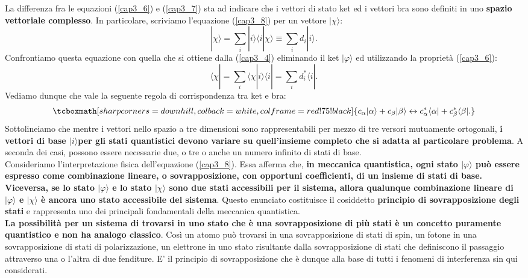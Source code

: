 \documentclass[a4paper,12pt,oneside]{book}
\begin{document}
La differenza fra le equazioni (\ref{cap3_6}) e (\ref{cap3_7}) sta ad indicare che i vettori di stato ket ed i vettori bra sono definiti in uno \textbf{spazio vettoriale complesso}. In particolare, scriviamo l'equazione (\ref{cap3_8}) per un vettore $| \chi\rangle$:
	\begin{equation}
		| \chi \rangle = \sum \limits_{i} | i \rangle \langle i | \chi \rangle \equiv \sum \limits_{i} d_i | i \rangle .
	\end{equation}
Confrontiamo questa equazione con quella che si ottiene dalla (\ref{cap3_4}) eliminando il ket $| \varphi \rangle$ ed utilizzando la proprietà (\ref{cap3_6}):
	\begin{equation}
		\langle \chi | =\sum \limits_{i} \langle \chi | i \rangle \langle i | = \sum \limits_{i} d^*_i \langle i | .
	\end{equation}
Vediamo dunque che vale la seguente regola di corrispondenza tra ket e bra:
	\begin{equation}
		\tcboxmath[sharp corners=downhill ,colback=white,colframe=red!75!black]{
			c_{\alpha}| \alpha \rangle +c_{\beta} | \beta \rangle  \leftrightarrow c^*_{\alpha}\langle \alpha | +c^*_{\beta}\langle \beta | .
			}
	\end{equation}
Sottolineiamo che mentre i vettori nello spazio a tre dimensioni sono rappresentabili per mezzo di tre versori mutuamente ortogonali, \textbf{i vettori di base $| i \rangle $per gli stati quantistici devono variare su quell'insieme completo che si adatta al particolare problema}. A seconda dei casi, possono essere necessarie due, o tre o anche un numero infinito di stati di base.\\

Consideriamo l'interpretazione fisica dell'equazione (\ref{cap3_8}). Essa afferma che, \textbf{in meccanica quantistica, ogni stato $| \varphi \rangle$ può essere espresso come combinazione lineare, o sovrapposizione, con opportuni coefficienti, di un insieme di stati di base. Viceversa, se lo stato $| \varphi \rangle$ e lo stato $| \chi \rangle$ sono due stati accessibili per il sistema, allora qualunque combinazione lineare di $| \varphi \rangle$ e $| \chi \rangle$ è ancora uno stato accessibile del sistema}. Questo enunciato costituisce il cosiddetto \textbf{principio di sovrapposizione degli stati} e rappresenta uno dei principali fondamentali della meccanica quantistica.\\

\textbf{La possibilità per un sistema di trovarsi in uno stato che è una sovrapposizione di più stati è un concetto puramente quantistico e non ha analogo classico}. Così un atomo può trovarsi in una sovrapposizione di stati di spin, un fotone in una sovrapposizione di stati di polarizzazione, un elettrone in uno stato risultante dalla sovrapposizione di stati che definiscono il passaggio attraverso una o l'altra di due fenditure. E' il principio di sovrapposizione che è dunque alla base di tutti i fenomeni di interferenza sin qui considerati.\\
\end{document}

